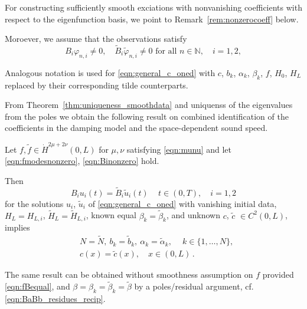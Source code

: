 For constructing sufficiently smooth exciations with nonvanishing coefficients with respect to the eigenfunction basis, 
we point to Remark~\ref{rem:nonzerocoeff} below.

Moroever, we assume that the observations satisfy 
\begin{equation}\label{eqn:Binonzero}
B_i\varphi_{n,i}\not=0, \quad \tilde{B}_i\tilde{\varphi}_{n,i} \not=0\mbox{ for all }n\in\mathbb{N}, \quad i=1,2, 
\end{equation}

Analogous notation is used for \eqref{eqn:general_c_oned} with $c$, 
$b_k$, $\alpha_k$, $\beta_k$, $f$, $H_0$, $H_L$ replaced by their corresponding tilde counterparts.

From Theorem~\ref{thm:uniqueness_smoothdata} and uniquenss of the eigenvalues from the poles we obtain the following result on combined identification of the coefficients in the damping model and the space-dependent sound speed.
\begin{corollary}\label{cor:uniqueness_smoothdata_and_c}
Let $f,\tilde{f}\in \dot{H}^{2\mu+2\nu}(0,L)$ for $\mu,\nu$ satisfying \eqref{eqn:munu} and let
\eqref{eqn:fmodesnonzero}, \eqref{eqn:Binonzero} hold.

Then
\[
B_i u_i(t) = \tilde B_i \tilde u_i(t)\, \quad t\in(0,T), \quad i=1,2
\]
for the solutions $u_i$, $\tilde{u}_i$ of \eqref{eqn:general_c_oned}
with vanishing initial data, $H_L=H_{L,i}$, $\tilde{H}_L=\tilde{H}_{L,i}$, known equal $\beta_k=\tilde{\beta}_k$, and unknown $c$, $\tilde{c}$ $\in C^2(0,L)$,
implies
\[
\begin{aligned}
&N=\tilde{N}, \ 
b_k=\tilde{b}_k, \ \alpha_k=\tilde{\alpha}_k, \ 
\quad k\in\{1,\ldots,N\}, 
\\ 
&c(x)=\tilde{c}(x), \quad x\in(0,L)\,. 
\end{aligned}
\]
\end{corollary}
The same result can be obtained without smoothness assumption on $f$ 
provided \eqref{eqn:fBequal}, and $\beta=\beta_k=\tilde{\beta}_k=\tilde{\beta}$ by a poles/residual argument, cf. \eqref{eqn:BaBb_residues_recip}.

